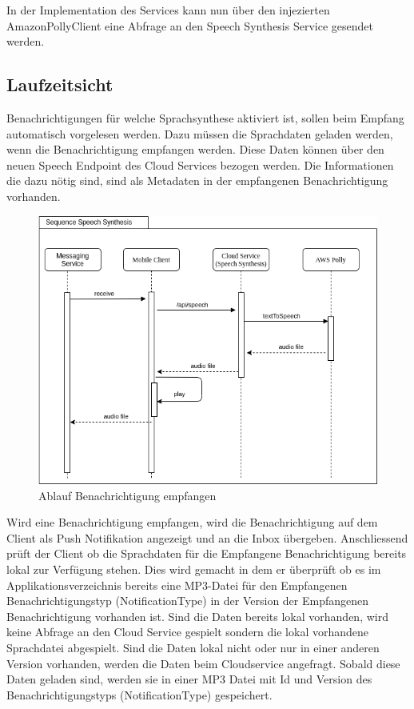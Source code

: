 In der Implementation des Services kann nun über den injezierten AmazonPollyClient eine Abfrage an den Speech Synthesis Service gesendet werden.

\clearpage

\subsection*{Laufzeitsicht}

Benachrichtigungen für welche Sprachsynthese aktiviert ist, sollen beim Empfang automatisch vorgelesen werden.
Dazu müssen die Sprachdaten geladen werden, wenn die Benachrichtigung empfangen werden.
Diese Daten können über den neuen Speech Endpoint des Cloud Services bezogen werden.
Die Informationen die dazu nötig sind, sind als Metadaten in der empfangenen Benachrichtigung vorhanden.

\begin{figure}[h]
    \centering
    \begin{minipage}[b]{0.9\textwidth}
        \includegraphics[width=\textwidth]{graphics/diagramms/Sequence_Speech_Synth_V01}
        \caption{Ablauf Benachrichtigung empfangen}
    \end{minipage}
\end{figure}

Wird eine Benachrichtigung empfangen, wird die Benachrichtigung auf dem Client als Push Notifikation angezeigt und an die Inbox übergeben.
Anschliessend prüft der Client ob die Sprachdaten für die Empfangene Benachrichtigung bereits lokal zur Verfügung stehen.
Dies wird gemacht in dem er überprüft ob es im Applikationsverzeichnis bereits eine MP3-Datei für den Empfangenen Benachrichtigungstyp
(NotificationType) in der Version der Empfangenen Benachrichtigung vorhanden ist.
Sind die Daten bereits lokal vorhanden, wird keine Abfrage an den Cloud Service gespielt sondern die lokal vorhandene Sprachdatei abgespielt.
Sind die Daten lokal nicht oder nur in einer anderen Version vorhanden, werden die Daten beim Cloudservice angefragt.
Sobald diese Daten geladen sind, werden sie in einer MP3 Datei mit Id und Version des Benachrichtigungstyps (NotificationType) gespeichert.

\clearpage
